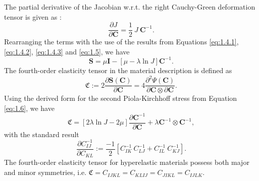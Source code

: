 The partial derivative of the Jacobian w.r.t. the right Cauchy-Green deformation tensor is given as \cite[see][page 46 Equation (3.124)]{Wriggers2008}:
\begin{equation}
\dfrac{\partial J}{\partial \mathbf{C}} = \dfrac{1}{2} \ J \ \mathbf{C}^{-1}.
\label{eq:1.5}
\end{equation}
Rearranging the terms with the use of the results from Equations \eqref{eq:1.4.1}, \eqref{eq:1.4.2}, \eqref{eq:1.4.3} and \eqref{eq:1.5}, we have
\begin{equation}
\mathbf{S} = \mu \mathbf{I} - \left[ \mu - \lambda \ln J \right] \mathbf{C}^{-1}.
\label{eq:1.6}
\end{equation}
The fourth-order elasticity tensor in the material description is defined as 
\begin{equation}
\mathfrak{C} := 2 \dfrac{\partial \mathbf{S}(\mathbf{C})}{\partial \mathbf{C}} = 4 \dfrac{\partial^2 \Psi (\mathbf{C})}{\partial \mathbf{C} \otimes \partial \mathbf{C}}.
\label{eq:1.6.2}
\end{equation}
Using the derived form for the second Piola-Kirchhoff stress from Equation \eqref{eq:1.6}, we have
\begin{equation}
\mathfrak{C} = \left[ 2 \lambda \ln J - 2 \mu \right]\dfrac{\partial \mathbf{C}^{-1}}{\partial \mathbf{C}} + \lambda \mathbf{C}^{-1} \otimes \mathbf{C}^{-1},
\end{equation}
with the standard result \cite[see][page 519]{Wriggers2008}
\begin{equation}
\dfrac{\partial C^{-1}_{IJ}}{\partial C_{KL}} := \dfrac{-1}{2} \left[ C^{-1}_{IK} \ C^{-1}_{LJ} + C^{-1}_{IL} \ C^{-1}_{KJ} \right].
\end{equation}
The fourth-order elasticity tensor for hyperelastic materials possess both major and minor symmetries, i.e. $\mathfrak{C} = C_{IJKL} = C_{KLIJ} = C_{JIKL} = C_{IJLK}$.

